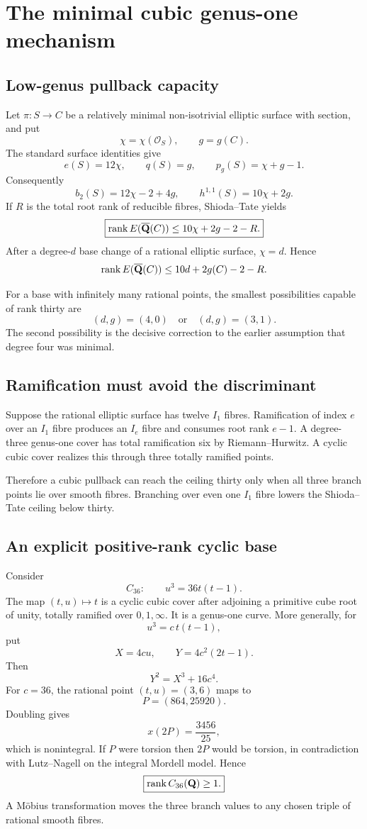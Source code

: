 \section{The minimal cubic genus-one mechanism}

\subsection{Low-genus pullback capacity}

Let $\pi:S\to C$ be a relatively minimal non-isotrivial elliptic surface with
section, and put
\[
\chi=\chi(\mathcal O_S),\qquad g=g(C).
\]
The standard surface identities give
\[
e(S)=12\chi,\qquad q(S)=g,\qquad p_g(S)=\chi+g-1.
\]
Consequently
\[
b_2(S)=12\chi-2+4g,
\qquad
\boxed{h^{1,1}(S)=10\chi+2g.}
\]
If $R$ is the total root rank of reducible fibres, Shioda--Tate yields
\[
\boxed{
\operatorname{rank} E(\overline{\mathbf Q}(C))\le10\chi+2g-2-R.
}
\]
After a degree-$d$ base change of a rational elliptic surface,
$\chi=d$.  Hence
\[
\operatorname{rank} E(\overline{\mathbf Q}(C))\le10d+2g(C)-2-R.
\]

For a base with infinitely many rational points, the smallest possibilities
capable of rank thirty are
\[
\boxed{(d,g)=(4,0)\quad\text{or}\quad(d,g)=(3,1).}
\]
The second possibility is the decisive correction to the earlier assumption
that degree four was minimal.

\subsection{Ramification must avoid the discriminant}

Suppose the rational elliptic surface has twelve $I_1$ fibres.  Ramification
of index $e$ over an $I_1$ fibre produces an $I_e$ fibre and consumes root
rank $e-1$.  A degree-three genus-one cover has total ramification six by
Riemann--Hurwitz.  A cyclic cubic cover realizes this through three totally
ramified points.

Therefore a cubic pullback can reach the ceiling thirty only when all three
branch points lie over smooth fibres.  Branching over even one $I_1$ fibre
lowers the Shioda--Tate ceiling below thirty.

\subsection{An explicit positive-rank cyclic base}

Consider
\[
C_{36}:\qquad u^3=36t(t-1).
\]
The map $(t,u)\mapsto t$ is a cyclic cubic cover after adjoining a primitive
cube root of unity, totally ramified over $0,1,\infty$.  It is a genus-one
curve.  More generally, for
\[
u^3=c\,t(t-1),
\]
put
\[
X=4cu,\qquad Y=4c^2(2t-1).
\]
Then
\[
Y^2=X^3+16c^4.
\]
For $c=36$, the rational point $(t,u)=(3,6)$ maps to
\[
P=(864,25920).
\]
Doubling gives
\[
x(2P)=\frac{3456}{25},
\]
which is nonintegral.  If $P$ were torsion then $2P$ would be torsion, in
contradiction with Lutz--Nagell on the integral Mordell model.  Hence
\[
\boxed{\operatorname{rank} C_{36}(\mathbf Q)\ge1.}
\]
A M\"obius transformation moves the three branch values to any chosen triple
of rational smooth fibres.

